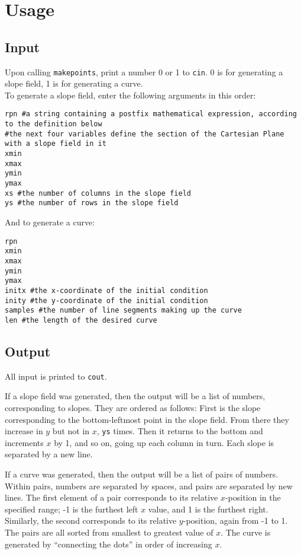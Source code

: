 \documentclass{article}
\begin{document}
\section{Usage}
\subsection{Input}

Upon calling \lstinline{makepoints}, print a number 0 or 1 to \lstinline{cin}. 0 is for generating a slope field, 1 is for generating a curve.\\
To generate a slope field, enter the following arguments in this order:

\begin{verbatim}
rpn #a string containing a postfix mathematical expression, according to the definition below
#the next four variables define the section of the Cartesian Plane with a slope field in it
xmin
xmax
ymin
ymax
xs #the number of columns in the slope field
ys #the number of rows in the slope field
\end{verbatim}

And to generate a curve:
\begin{verbatim}
rpn
xmin
xmax
ymin
ymax
initx #the x-coordinate of the initial condition
inity #the y-coordinate of the initial condition
samples #the number of line segments making up the curve
len #the length of the desired curve
\end{verbatim}
\subsection{Output}
All input is printed to \lstinline{cout}.

If a slope field was generated, then the output will be a list of numbers, corresponding to slopes. They are ordered as follows: First is the slope corresponding to the bottom-leftmost point in the slope field. From there they increase in $y$ but not in $x$, \lstinline{ys} times. Then it returns to the bottom and increments $x$ by 1, and so on, going up each column in turn. Each slope is separated by a new line.

If a curve was generated, then the output will be a list of pairs of numbers. Within pairs, numbers are separated by spaces, and pairs are separated by new lines. The first element of a pair corresponds to its relative $x$-position in the specified range; -1 is the furthest left $x$ value, and 1 is the furthest right. Similarly, the second corresponds to its relative $y$-position, again from -1 to 1. The pairs are all sorted from smallest to greatest value of $x$. The curve is generated by ``connecting the dots'' in order of increasing $x$.
\end{document}
